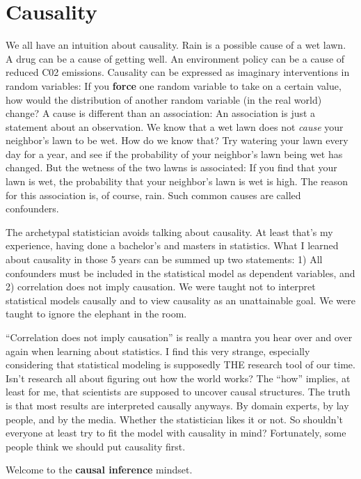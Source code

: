 \documentclass[
  10pt,
]{scrbook}
\begin{document}
\hypertarget{causality}{%
\section{Causality}\label{causality}}

We all have an intuition about causality.
Rain is a possible cause of a wet lawn.
A drug can be a cause of getting well.
An environment policy can be a cause of reduced C02 emissions.
Causality can be expressed as imaginary interventions in random variables:
If you \textbf{force} one random variable to take on a certain value, how would the distribution of another random variable (in the real world) change?
A cause is different than an association:
An association is just a statement about an observation.
We know that a wet lawn does not \emph{cause} your neighbor's lawn to be wet.
How do we know that? Try watering your lawn every day for a year, and see if the probability of your neighbor's lawn being wet has changed.
But the wetness of the two lawns is associated:
If you find that your lawn is wet, the probability that your neighbor's lawn is wet is high.
The reason for this association is, of course, rain.
Such common causes are called confounders.

The archetypal statistician avoids talking about causality.
At least that's my experience, having done a bachelor's and masters in statistics.
What I learned about causality in those 5 years can be summed up two statements: 1) All confounders must be included in the statistical model as dependent variables, and 2) correlation does not imply causation.
We were taught not to interpret statistical models causally and to view causality as an unattainable goal.
We were taught to ignore the elephant in the room.

``Correlation does not imply causation'' is really a mantra you hear over and over again when learning about statistics.
I find this very strange, especially considering that statistical modeling is supposedly THE research tool of our time.
Isn't research all about figuring out how the world works?
The ``how'' implies, at least for me, that scientists are supposed to uncover causal structures.
The truth is that most results are interpreted causally anyways.
By domain experts, by lay people, and by the media.
Whether the statistician likes it or not.
So shouldn't everyone at least try to fit the model with causality in mind?
Fortunately, some people think we should put causality first.

Welcome to the \textbf{causal inference} mindset.
\end{document}
